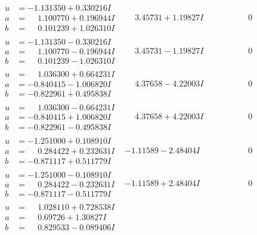 \documentclass[1p]{elsarticle_modified}
\theoremstyle{definition}
\begin{document}
$$\begin{array}{c|c|c}
\begin{aligned}
u &= -1.131350 + 0.330216 I \\
a &= \phantom{-}1.100770 + 0.196944 I \\
b &= \phantom{-}0.101239 + 1.026310 I\end{aligned}
 & \phantom{-}3.45731 + 1.19827 I & \phantom{-0.000000 } 0 \\ \hline\begin{aligned}
u &= -1.131350 - 0.330216 I \\
a &= \phantom{-}1.100770 - 0.196944 I \\
b &= \phantom{-}0.101239 - 1.026310 I\end{aligned}
 & \phantom{-}3.45731 - 1.19827 I & \phantom{-0.000000 } 0 \\ \hline\begin{aligned}
u &= \phantom{-}1.036300 + 0.664231 I \\
a &= -0.840415 - 1.006820 I \\
b &= -0.822961 + 0.495838 I\end{aligned}
 & \phantom{-}4.37658 - 4.22003 I & \phantom{-0.000000 } 0 \\ \hline\begin{aligned}
u &= \phantom{-}1.036300 - 0.664231 I \\
a &= -0.840415 + 1.006820 I \\
b &= -0.822961 - 0.495838 I\end{aligned}
 & \phantom{-}4.37658 + 4.22003 I & \phantom{-0.000000 } 0 \\ \hline\begin{aligned}
u &= -1.251000 + 0.108910 I \\
a &= \phantom{-}0.284422 + 0.232631 I \\
b &= -0.871117 + 0.511779 I\end{aligned}
 & -1.11589 - 2.48404 I & \phantom{-0.000000 } 0 \\ \hline\begin{aligned}
u &= -1.251000 - 0.108910 I \\
a &= \phantom{-}0.284422 - 0.232631 I \\
b &= -0.871117 - 0.511779 I\end{aligned}
 & -1.11589 + 2.48404 I & \phantom{-0.000000 } 0 \\ \hline\begin{aligned}
u &= \phantom{-}1.028110 + 0.728538 I \\
a &= \phantom{-}0.69726 + 1.30827 I \\
b &= \phantom{-}0.829533 - 0.089406 I\end{aligned}

\end{array}$$
\end{document}
